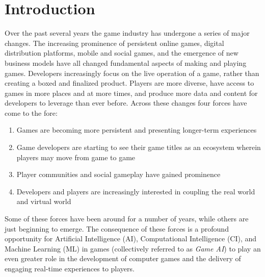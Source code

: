 \documentclass[conference]{IEEEtran}
\begin{document}

\section{Introduction}
Over the past several years the game industry has undergone a series of major changes. 
The increasing prominence of persistent online games, digital distribution platforms, mobile and social games, and the emergence of new business models have all changed fundamental aspects of making and playing games. 
Developers increasingly focus on the live operation of a game, rather than creating a boxed and finalized product.
Players are more diverse, have access to games in more places and at more times, and produce more data and content for developers to leverage than ever before. Across these changes four forces have come to the fore:
\begin{enumerate}
\item Games are becoming more persistent and presenting longer-term experiences %
\item Game developers are starting to see their game titles as an ecosystem wherein players may move from game to game %
\item Player communities and social gameplay have gained prominence
\item Developers and players are increasingly interested in coupling the real world and virtual world %
\end{enumerate}
\noindent
Some of these forces have been around for a number of years, while others are just beginning to emerge.
The consequence of these forces is a profound opportunity for Artificial Intelligence (AI), Computational Intelligence (CI), and Machine Learning (ML) in games (collectively referred to as {\em Game AI}) to play an even greater role in the development of computer games and the delivery of engaging real-time experiences to players. 
\end{document}
